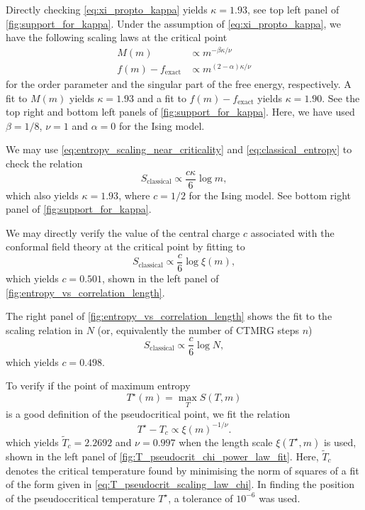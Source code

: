 Directly checking \autoref{eq:xi_propto_kappa} yields $\kappa = 1.93$, see top left panel of
\autoref{fig:support_for_kappa}.
Under the assumption of \autoref{eq:xi_propto_kappa}, we have the following scaling laws at the critical point
\begin{align}\label{eq:scaling_laws_order_param_free_energy_kappa}
  M(m) & \propto m^{-\beta \kappa / \nu} \\
  f(m) - f_{\text{exact}} & \propto m^{(2-\alpha)\kappa / \nu}
\end{align}
for the order parameter and the singular part of the free energy, respectively. A fit to $M(m)$ yields $\kappa = 1.93$
and a fit to $f(m) - f_{\text{exact}}$ yields $\kappa = 1.90$. See the top right and bottom left panels of
\autoref{fig:support_for_kappa}. Here, we have used $\beta = 1/8$, $\nu = 1$ and $\alpha = 0$ for the Ising model.

We may use \autoref{eq:entropy_scaling_near_criticality} and \autoref{eq:classical_entropy} to check the
relation
\begin{equation}\label{eq:scaling_law_entropy_kappa}
  S_{\text{classical}} \propto \frac{c\kappa}{6}\log m,
\end{equation}
which also yields $\kappa = 1.93$, where $c = 1/2$ for the Ising model. See bottom right panel of
\autoref{fig:support_for_kappa}.

We may directly verify the value of the central charge $c$ associated with the conformal field theory at the critical
point by fitting to
\begin{equation}\label{eq:entropy_vs_correlation_length}
  S_{\text{classical}} \propto \frac{c}{6} \log \xi(m),
\end{equation}
which yields $c = 0.501$, shown in the left panel of \autoref{fig:entropy_vs_correlation_length}.

The right panel of \autoref{fig:entropy_vs_correlation_length} shows the fit to the scaling relation in $N$ (or,
equivalently the number of CTMRG steps $n$)
\begin{equation}\label{eq:entropy_vs_N}
  S_{\text{classical}} \propto \frac{c}{6} \log N,
\end{equation}
which yields $c = 0.498$.

To verify if the point of maximum entropy
\begin{equation}
  T^{\star}(m) = \max_{T} S(T, m)
\end{equation}
is a good definition of the pseudocritical point, we fit the relation
\begin{equation}\label{eq:T_pseudocrit_scaling_law_chi}
  T^{\star} - T_c \propto \xi(m)^{-1 / \nu}.
\end{equation}
which yields $\widetilde{T}_c = 2.2692$ and $\nu = 0.997$ when the length scale $\xi(T^{\star}, m)$ is used, shown in
the left panel of \autoref{fig:T_pseudocrit_chi_power_law_fit}. Here, $\widetilde{T}_c$ denotes the critical temperature
found by minimising the norm of squares of a fit of the form given in \autoref{eq:T_pseudocrit_scaling_law_chi}. In
finding the position of the pseudoccritical temperature $T^{\star}$, a tolerance of $10^{-6}$ was used.

